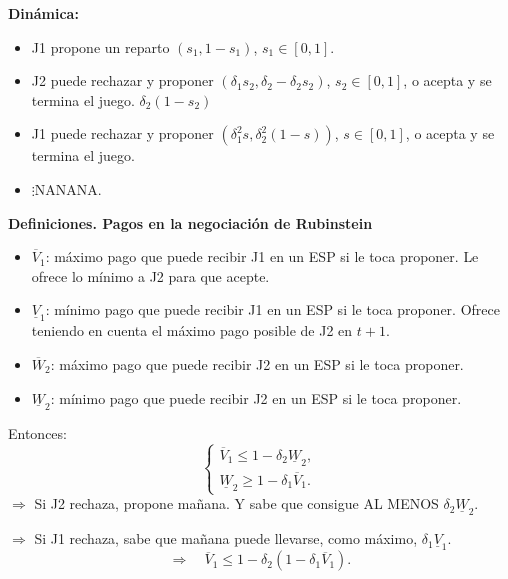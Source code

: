 \documentclass[11pt,a4paper]{article}
\newenvironment{apuntebox}[1]{\begin{tcolorbox}[colback=palered,colframe=inkred,
 boxrule=0.7pt,arc=0mm,left=0.8em,right=0.8em,top=0.45em,bottom=0.45em]
 \textcolor{inkred}{\textbf{#1}}\quad}{\end{tcolorbox}}
\newcommand{\gris}[1]{\textcolor{pencilgray}{#1}}
\begin{document}
\textbf{Dinámica:}
\begin{itemize}
\item J1 propone un reparto $(s_1,1-s_1)$, $s_1\in[0,1]$.
\item J2 puede rechazar y proponer $(\delta_1s_2,\delta_2-\delta_2s_2)$, $s_2\in[0,1]$, o acepta y se termina el juego. \gris{$\delta_2(1-s_2)$}
\item J1 puede rechazar y proponer $(\delta_1^2s,\delta_2^2(1-s))$, $s\in[0,1]$, o acepta y se termina el juego.
\item $\vdots$\quad NANANA.
\end{itemize}
\begin{apuntebox}{Definiciones. Pagos en la negociación de Rubinstein}
\begin{itemize}
\item $\overline V_1$: máximo pago que puede recibir J1 en un ESP si le toca proponer. \gris{Le ofrece lo mínimo a J2 para que acepte.}
\item $\underline V_1$: mínimo pago que puede recibir J1 en un ESP si le toca proponer. \gris{Ofrece teniendo en cuenta el máximo pago posible de J2 en $t+1$.}
\item $\overline W_2$: máximo pago que puede recibir J2 en un ESP si le toca proponer.
\item $\underline W_2$: mínimo pago que puede recibir J2 en un ESP si le toca proponer.
\end{itemize}
\end{apuntebox}
Entonces:
\[\begin{cases}\overline V_1\leq1-\delta_2\underline W_2,\\\underline W_2\geq1-\delta_1\overline V_1.\end{cases}\]
\gris{$\Rightarrow$ Si J2 rechaza, propone mañana. Y sabe que consigue AL MENOS $\delta_2\underline W_2$.}

\gris{$\Rightarrow$ Si J1 rechaza, sabe que mañana puede llevarse, como máximo, $\delta_1\underline V_1$.}
\[\Rightarrow\quad\overline V_1\leq1-\delta_2(1-\delta_1\overline V_1).\]
\end{document}
